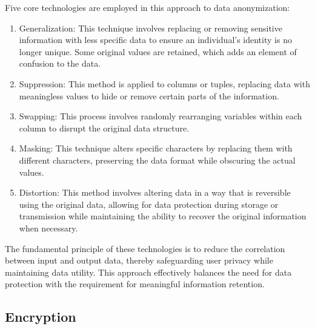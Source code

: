 \documentclass[a4paper,12pt]{article}
\begin{document}
Five core technologies are employed in this approach to data anonymization:
\begin{enumerate}
    \item Generalization: This technique involves replacing or removing sensitive information with less specific data to ensure an individual's identity is no longer unique. Some original values are retained, which adds an element of confusion to the data.
    \item Suppression: This method is applied to columns or tuples, replacing data with meaningless values to hide or remove certain parts of the information.
    \item Swapping: This process involves randomly rearranging variables within each column to disrupt the original data structure.
    \item Masking: This technique alters specific characters by replacing them with different characters, preserving the data format while obscuring the actual values.
    \item Distortion: This method involves altering data in a way that is reversible using the original data, allowing for data protection during storage or transmission while maintaining the ability to recover the original information when necessary. 
\end{enumerate}

The fundamental principle of these technologies is to reduce the correlation between input and output data, thereby safeguarding user privacy while maintaining data utility. This approach effectively balances the need for data protection with the requirement for meaningful information retention.
 
\subsection{Encryption}
\end{document}
